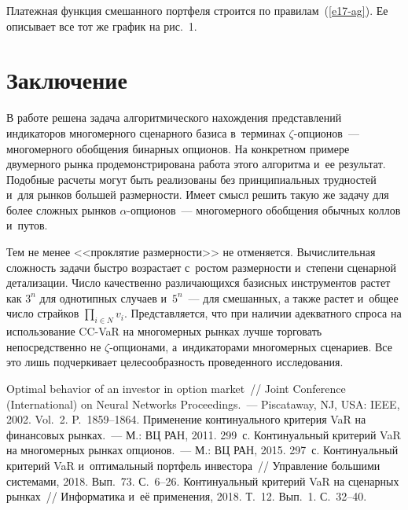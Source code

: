 \begin{multicols}{2}
  Платежная функция смешанного портфеля строится по  
правилам~(\ref{e17-ag}). Ее описывает все тот же график на рис.~1. 
  
  \section{Заключение }
  
  В работе решена задача алгоритмического нахождения представлений 
индикаторов многомерного сценарного базиса в~терминах  
$\zeta$-оп\-ци\-о\-нов~--- многомерного обобщения бинарных опционов. На 
конкретном примере двумерного рынка продемонстрирована работа этого 
алгоритма и~ее результат. Подобные расчеты могут быть реализованы без 
принципиальных трудностей и~для рынков большей размерности. Имеет смысл 
решить такую же задачу для более сложных рынков $\alpha$-оп\-ци\-о\-нов~--- 
многомерного обобщения обычных коллов и~путов. 
  
  Тем не менее <<проклятие размерности>> не отменяется. Вычислительная 
сложность задачи быстро возрастает с~ростом размерности и~степени сценарной 
детализации. Число качественно различающихся базисных инструментов 
растет как $3^n$ для однотипных случаев и~$5^n$~--- для смешанных, а также 
растет и~общее число страйков $\prod_{i\in N} v_i$. Представляется, что при 
наличии адекватного спроса на использование CC-VaR на многомерных рынках 
лучше торговать непосредственно не $\zeta$-оп\-ци\-о\-на\-ми, а~индикаторами 
многомерных сценариев. Все это лишь подчеркивает целесообразность 
проведенного исследования. 
  
{\small\frenchspacing
 {%
 \begin{thebibliography}{9}
   Optimal behavior of an investor in option market~//  Joint Conference 
(International) on Neural Networks Proceedings.~--- Piscataway, NJ, USA: IEEE, 2002. Vol.~2. 
P.~1859--1864. 
   Применение континуального критерия VaR на финансовых 
рынках.~--- М.: ВЦ РАН, 2011. 299~с. 
   Континуальный критерий VaR на многомерных рынках 
опционов.~--- М.: ВЦ РАН, 2015. 297~с. 
   Континуальный критерий VaR и~оптимальный портфель 
инвестора~// Управление большими системами, 2018. 
Вып.~73. С.~6--26.
   Континуальный критерий VaR на сценарных рынках~// 
Информатика и~её применения, 2018. Т.~12. Вып.~1. С.~32--40. 
 

\end{thebibliography}}}
\end{multicols}
